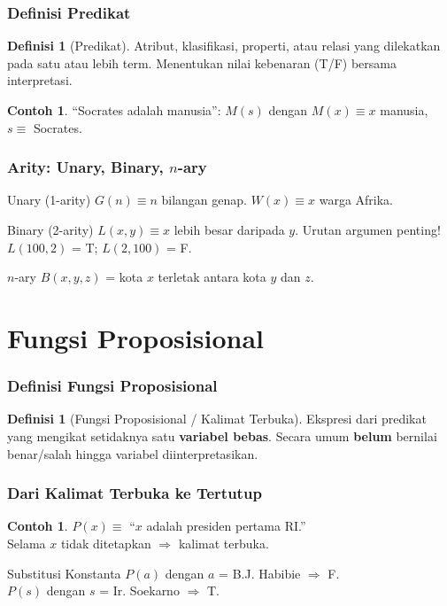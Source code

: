 \documentclass[handout]{beamer}
\theoremstyle{definition}
\newtheorem{definisi}[theorem]{Definisi}
\theoremstyle{example}
\newtheorem{contoh}[theorem]{Contoh}
\begin{document}
\begin{frame}
\frametitle{Definisi Predikat}
\begin{definisi}[Predikat]
Atribut, klasifikasi, properti, atau relasi yang dilekatkan pada satu atau lebih term. Menentukan nilai kebenaran (T/F) bersama interpretasi.
\end{definisi}
\begin{contoh}
``Socrates adalah manusia'': $M(s)$ dengan $M(x) \equiv x$ manusia, $s \equiv$ Socrates.
\end{contoh}
\end{frame}

\begin{frame}
\frametitle{Arity: Unary, Binary, $n$-ary}
\begin{block}{Unary (1-arity)}
$G(n) \equiv n$ bilangan genap. $W(x) \equiv x$ warga Afrika.
\end{block}
\begin{block}{Binary (2-arity)}
$L(x,y) \equiv x$ lebih besar daripada $y$. Urutan argumen penting!
$L(100,2)$ = T; $L(2,100)$ = F.
\end{block}
\begin{block}{$n$-ary}
$B(x,y,z)$ = kota $x$ terletak antara kota $y$ dan $z$.
\end{block}
\end{frame}

\section{Fungsi Proposisional}

\begin{frame}
\frametitle{Definisi Fungsi Proposisional}
\begin{definisi}[Fungsi Proposisional / Kalimat Terbuka]
Ekspresi dari predikat yang mengikat setidaknya satu \textbf{variabel bebas}. Secara umum \textbf{belum} bernilai benar/salah hingga variabel diinterpretasikan.
\end{definisi}
\end{frame}

\begin{frame}
\frametitle{Dari Kalimat Terbuka ke Tertutup}
\begin{contoh}
$P(x) \equiv$ ``$x$ adalah presiden pertama RI.''\\
Selama $x$ tidak ditetapkan $\Rightarrow$ kalimat terbuka.
\end{contoh}
\begin{block}{Substitusi Konstanta}
$P(a)$ dengan $a$ = B.J. Habibie $\Rightarrow$ F.\\
$P(s)$ dengan $s$ = Ir. Soekarno $\Rightarrow$ T.
\end{block}
\end{frame}
\end{document}
